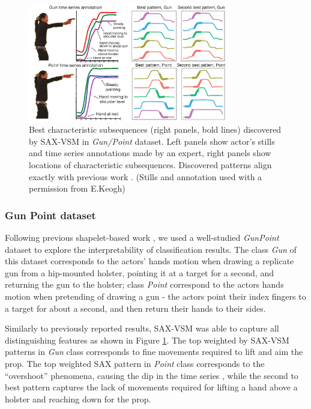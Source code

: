\documentclass[conference]{IEEEtran}
\begin{document}
\begin{figure}[b]
   \centering
   \vspace{0.28cm}
   \includegraphics[width=87mm]{figures/gun-point.eps}
   \caption{Best characteristic subsequences (right panels, bold lines) discovered by 
   SAX-VSM in \textit{Gun/Point} dataset. 
   Left panels show actor's stills and time series annotations made by an expert, 
   right panels show locations of characteristic subsequences.
   Discovered patterns align exactly with previous work \cite{shapelet} \cite{bagnal}.
   (Stills and annotation used with a permission from E.Keogh) }
   \label{fig:shapelet-like-patterns}
   \vspace{-0.45cm}
\end{figure}

\subsubsection{Gun Point dataset}
Following previous shapelet-based work \cite{shapelet} \cite{bagnal}, 
we used a well-studied \textit{GunPoint} dataset \cite{gun} to explore the 
interpretability of classification results. The class \textit{Gun} of this dataset 
corresponds to the actors' hands motion when drawing a replicate gun from 
a hip-mounted holster, pointing it at a target for a second, and returning the 
gun to the holster; class \textit{Point} correspond to the actors hands motion 
when pretending of drawing a gun - the actors point their index fingers to 
a target for about a second, and then return their hands to their sides. 

Similarly to previously reported results, SAX-VSM was able to capture all 
distinguishing features as shown in Figure \ref{fig:shapelet-like-patterns}. 
The top weighted by SAX-VSM patterns in \textit{Gun} class corresponds 
to fine movements required to lift and aim the prop. 
The top weighted SAX pattern in \textit{Point} class corresponds to the 
``overshoot'' phenomena, causing the dip in the time series \cite{gun}, 
while the second to best pattern captures the lack of movements
required for lifting a hand above a holster and reaching down for the prop. 
\end{document}
